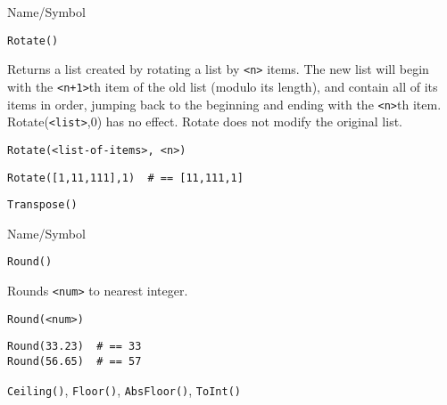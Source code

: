 \begin{desc}{Name/Symbol}
\item[Name/Symbol]	\verb+Rotate()+

\item[Description] 	Returns a list created by rotating a list by \verb!<n>! items.  
		The new list will begin with the \verb!<n+1>!th item of the old 
		list (modulo its length), and contain all of its items in 
		order, jumping back to the beginning and ending with the \verb!<n>!th
		item. Rotate(\verb!<list>!,0) has no effect.  Rotate does not modify 
		the original list.

\item[Usage]
\begin{verbatim}
Rotate(<list-of-items>, <n>)
\end{verbatim}

\item[Example]     	
\begin{verbatim}
Rotate([1,11,111],1)  # == [11,111,1]
\end{verbatim}

\item[See Also]    	\verb+Transpose()+
\end{desc}

\rl


\begin{desc}{Name/Symbol}
\item[Name/Symbol] 	\verb+Round()+

\item[Description] 	Rounds \verb+<num>+ to nearest integer.

\item[Usage]        	
\begin{verbatim}
Round(<num>)
\end{verbatim}

\item[Example]
\begin{verbatim}
Round(33.23)  # == 33
Round(56.65)  # == 57
\end{verbatim}

\item[See Also]     	\verb+Ceiling()+, \verb+Floor()+, \verb+AbsFloor()+, \verb+ToInt()+
\end{desc}

\rl

